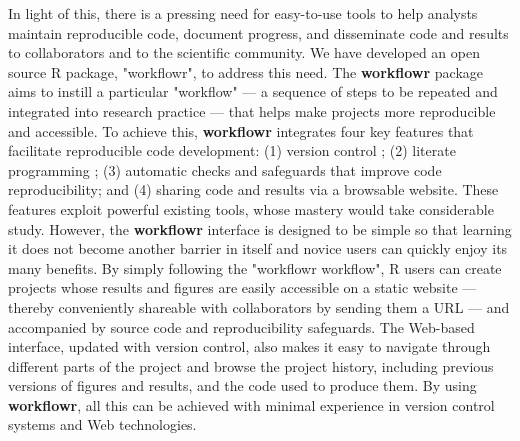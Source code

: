 \documentclass[9pt,a4paper]{extarticle}
\begin{document}
In light of this, there is a pressing need for easy-to-use tools to help
analysts maintain reproducible code, document progress, and disseminate
code and results to collaborators and to the scientific community. We
have developed an open source R \cite{R2019} package, "workflowr", to
address this need. The \textbf{workflowr} package aims to instill a particular
"workflow" --- a sequence of steps to be repeated and integrated into
research practice --- that helps make projects more reproducible and
accessible. To achieve this, \textbf{workflowr} integrates four key features that
facilitate reproducible code development: (1) version control
\cite{Loeliger2012, Chacon2014}; (2) literate programming
\cite{Xie2018}; (3) automatic checks and safeguards that improve code
reproducibility; and (4) sharing code and results via a browsable
website. These features exploit powerful existing tools, whose mastery
would take considerable study. However, the \textbf{workflowr} interface is
designed to be simple so that learning it does not become another
barrier in itself and novice users can quickly enjoy its many benefits.
By simply following the "workflowr workflow", R users can create
projects whose results and figures are easily accessible on a static
website --- thereby conveniently shareable with collaborators by sending
them a URL --- and accompanied by source code and reproducibility
safeguards. The Web-based interface, updated with version control, also
makes it easy to navigate through different parts of the project and
browse the project history, including previous versions of figures and
results, and the code used to produce them. By using \textbf{workflowr}, all this
can be achieved with minimal experience in version control systems and
Web technologies.
\end{document}
